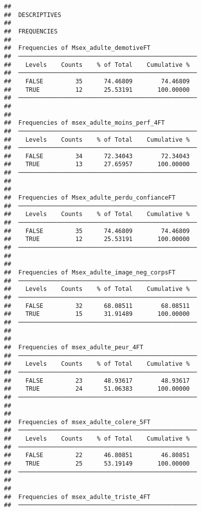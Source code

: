 \documentclass[
]{article}
\begin{document}
\begin{verbatim}
## 
##  DESCRIPTIVES
## 
##  FREQUENCIES
## 
##  Frequencies of Msex_adulte_demotiveFT              
##  ────────────────────────────────────────────────── 
##    Levels    Counts    % of Total    Cumulative %   
##  ────────────────────────────────────────────────── 
##    FALSE         35      74.46809        74.46809   
##    TRUE          12      25.53191       100.00000   
##  ────────────────────────────────────────────────── 
## 
## 
##  Frequencies of msex_adulte_moins_perf_4FT          
##  ────────────────────────────────────────────────── 
##    Levels    Counts    % of Total    Cumulative %   
##  ────────────────────────────────────────────────── 
##    FALSE         34      72.34043        72.34043   
##    TRUE          13      27.65957       100.00000   
##  ────────────────────────────────────────────────── 
## 
## 
##  Frequencies of Msex_adulte_perdu_confianceFT       
##  ────────────────────────────────────────────────── 
##    Levels    Counts    % of Total    Cumulative %   
##  ────────────────────────────────────────────────── 
##    FALSE         35      74.46809        74.46809   
##    TRUE          12      25.53191       100.00000   
##  ────────────────────────────────────────────────── 
## 
## 
##  Frequencies of Msex_adulte_image_neg_corpsFT       
##  ────────────────────────────────────────────────── 
##    Levels    Counts    % of Total    Cumulative %   
##  ────────────────────────────────────────────────── 
##    FALSE         32      68.08511        68.08511   
##    TRUE          15      31.91489       100.00000   
##  ────────────────────────────────────────────────── 
## 
## 
##  Frequencies of msex_adulte_peur_4FT                
##  ────────────────────────────────────────────────── 
##    Levels    Counts    % of Total    Cumulative %   
##  ────────────────────────────────────────────────── 
##    FALSE         23      48.93617        48.93617   
##    TRUE          24      51.06383       100.00000   
##  ────────────────────────────────────────────────── 
## 
## 
##  Frequencies of msex_adulte_colere_5FT              
##  ────────────────────────────────────────────────── 
##    Levels    Counts    % of Total    Cumulative %   
##  ────────────────────────────────────────────────── 
##    FALSE         22      46.80851        46.80851   
##    TRUE          25      53.19149       100.00000   
##  ────────────────────────────────────────────────── 
## 
## 
##  Frequencies of msex_adulte_triste_4FT              
##  ────────────────────────────────────────────────── 

\end{verbatim}
\end{document}
